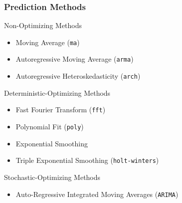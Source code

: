 \begin{frame}
    \frametitle{\deploy Prediction Methods}
    Non-Optimizing Methods 
    \begin{itemize}
        \item Moving Average (\texttt{ma})
        \item Autoregressive Moving Average (\texttt{arma})
        \item Autoregressive Heteroskedasticity (\texttt{arch})
    \end{itemize}
    Deterministic-Optimizing Methods 
    \begin{itemize}
        \item Fast Fourier Transform (\texttt{fft})
        \item Polynomial Fit (\texttt{poly})
        \item Exponential Smoothing
        \item Triple Exponential Smoothing (\texttt{holt-winters})
    \end{itemize}
    Stochastic-Optimizing Methods 
    \begin{itemize}
        \item Auto-Regressive Integrated Moving Averages (\texttt{ARIMA})
    \end{itemize}
\end{frame}